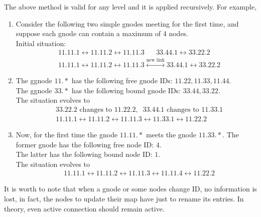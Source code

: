 \documentclass[a4paper]{article}
\newcommand{\T}[1]{\textrm{#1}}
\newcommand{\eal}[1]{{\begin{align*} #1 \end{align*}}}
\def\'{{\;\;\;}}
\begin{document}
The above method is valid for any level and it is applied recursively. For
example, 
\begin{enumerate}
	\item Consider the following two simple gnodes meeting for the first time,
and suppose each gnode can contain a maximum of 4 nodes.\\		Initial situation:
\eal{
&11.11.1 \leftrightarrow 11.11.2 \leftrightarrow 11.11.3 
\'\' 33.44.1 \leftrightarrow 33.22.2\\
&11.11.1 \leftrightarrow 11.11.2 \leftrightarrow 11.11.3 \stackrel{\T{new
link}}{\leftrightarrow } 33.44.1 \leftrightarrow 33.22.2
}
\item The ggnode $11.*$ has the following free gnode IDs:
	$11.22,11.33,11.44$.\\
	The ggnode $33.*$ has the following bound gnode IDs: $33.44,33.22$.\\
	The situation evolves to
	\eal{&33.22.2 \T{ changes to } 11.22.2,\;\;33.44.1
	\T{ changes to } 11.33.1\\
&11.11.1 \leftrightarrow 11.11.2 \leftrightarrow 11.11.3 \leftrightarrow
11.33.1 \leftrightarrow 11.22.2}
\item Now, for the first time the gnode $11.11.*$ meets the gnode $11.33.*$.
	The former gnode has the following free node ID: $4$.\\
	The latter has the following bound node ID: $1$.\\
	The situation evolves to
\eal{ &11.11.1 \leftrightarrow 11.11.2 \leftrightarrow 11.11.3 \leftrightarrow
11.11.4 \leftrightarrow 11.22.2}
\end{enumerate}

It is worth to note that when a gnode or some nodes change ID, no information
is lost, in fact, the nodes to update their map have just to rename its
entries. In theory, even active connection should remain active.
\end{document}
